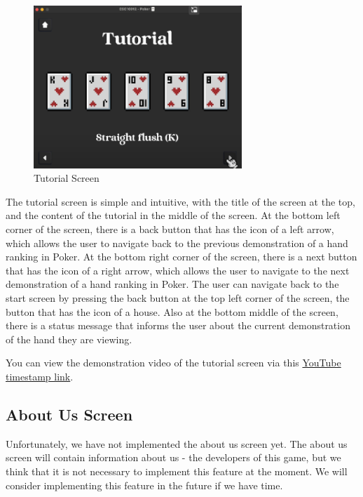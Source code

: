 \begin{figure}[H]
    \centering
    \includegraphics[width=0.7\textwidth]{figures/tutorial_screen.png}
    \caption{Tutorial Screen}
    \label{fig:tutorial-screen}
\end{figure}

\hspace{1cm} The tutorial screen is simple and intuitive, with the title of the screen at the top, and the content of the tutorial in the middle of the screen. At the bottom left corner of the screen, there is a back button that has the icon of a left arrow, which allows the user to navigate back to the previous demonstration of a hand ranking in Poker. At the bottom right corner of the screen, there is a next button that has the icon of a right arrow, which allows the user to navigate to the next demonstration of a hand ranking in Poker. The user can navigate back to the start screen by pressing the back button at the top left corner of the screen, the button that has the icon of a house. Also at the bottom middle of the screen, there is a status message that informs the user about the current demonstration of the hand they are viewing.

\vspace{0.5cm}

\hspace{1cm} You can view the demonstration video of the tutorial screen via this \href{https://youtu.be/OA0v6xG21N4?t=120}{YouTube timestamp link}.

\subsection{About Us Screen}
\label{subsec:about-us-screen}

\hspace{1cm} Unfortunately, we have not implemented the about us screen yet. The about us screen will contain information about us - the developers of this game, but we think that it is not necessary to implement this feature at the moment. We will consider implementing this feature in the future if we have time.

